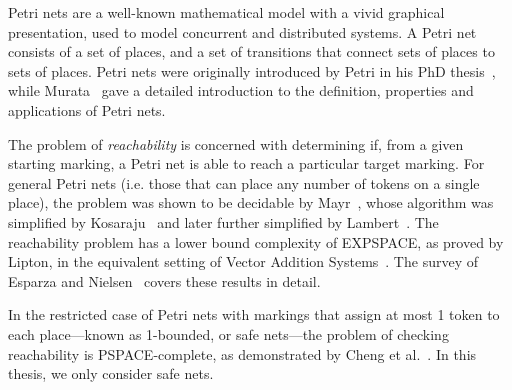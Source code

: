 Petri nets are a well-known mathematical model with a vivid graphical
presentation, used to model concurrent and distributed systems. A Petri net
consists of a set of places, and a set of transitions that connect sets of
places to sets of places. Petri nets were originally introduced by Petri in his
PhD thesis~\cite{Petri1962}, while Murata~\cite{Murata1989} gave a detailed
introduction to the definition, properties and applications of Petri nets.

The problem of \emph{reachability} is concerned with determining if, from a
given starting marking, a Petri net is able to reach a particular target
marking. For general Petri nets (i.e. those that can place any number of tokens
on a single place), the problem was shown to be decidable by
Mayr~\cite{Mayr1981}, whose algorithm was simplified by
Kosaraju~\cite{Kosaraju1982} and later further simplified by
Lambert~\cite{Lambert1992}.  The reachability problem has a lower bound
complexity of EXPSPACE, as proved by Lipton, in the equivalent setting of
Vector Addition Systems~\cite{Lipton1976}. The survey of {Esparza and
Nielsen}~\cite{Esparza1994} covers these results in detail.

In the restricted case of Petri nets with markings that assign at most 1 token
to each place---known as 1-bounded, or safe nets---the problem of checking
reachability is PSPACE-complete, as demonstrated by {Cheng et
al.}~\cite{Cheng1995}. In this thesis, we only consider safe nets.
